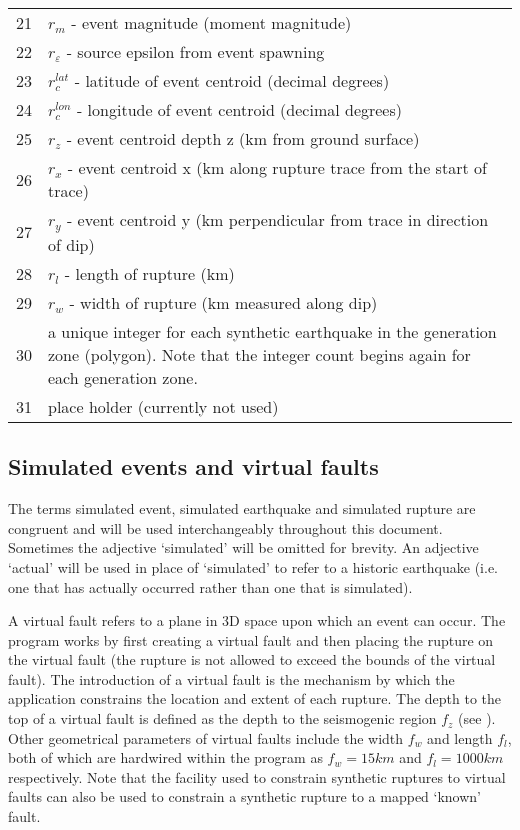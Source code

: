 \begin{table}
\begin{tabular}{r|p{}}
21 & $r_m$ - event magnitude (moment magnitude)\\
22 & $r_\varepsilon$ - source epsilon from event spawning\\
23 & $r_c^{lat}$ - latitude of event centroid (decimal degrees) \\
24 & $r_c^{lon}$ - longitude of event centroid (decimal degrees) \\
25 & $r_z$ - event centroid depth z (km from ground surface) \\
26 & $r_x$ - event centroid x (km along rupture trace from the
start of trace) \\
27 & $r_y$ - event centroid y (km perpendicular from trace in
direction of
dip) \\
28 & $r_l$ - length of rupture (km) \\
29 & $r_w$ - width of rupture (km measured along dip) \\
30 & a unique integer for each synthetic earthquake in the generation zone (polygon). Note that the integer count begins again for each generation zone. \\
31 & place holder (currently not used) \\
\hline
\end{tabular}
\end{table}


\subsection{Simulated events and virtual faults}

The terms simulated event, simulated
earthquake and simulated
rupture are congruent and will be used
interchangeably throughout this document. Sometimes the adjective
`simulated' will be omitted for brevity. An adjective `actual'
will be used in place of `simulated' to refer to a historic
earthquake (i.e. one that has actually occurred rather than one
that is simulated).

 A virtual fault refers to a plane in 3D space upon which an event can
occur.  The program 
 works by first creating a virtual fault and then
placing the rupture on the virtual fault (the
rupture is not allowed to exceed the bounds of the virtual
fault). The introduction of a virtual
fault is the mechanism by which the
 application constrains the location and extent
of each rupture. The depth to the top of a virtual
fault is defined as the depth to the
seismogenic region $f_z$ (see
). Other geometrical parameters
of virtual faults include the width $f_w$ and
length $f_l$, both of which are hardwired within the program
 as $f_w=15km$ and $f_l=1000km$
respectively. Note that the facility used to constrain synthetic
ruptures to virtual faults can also be used to constrain a
synthetic rupture to a mapped `known' fault.


